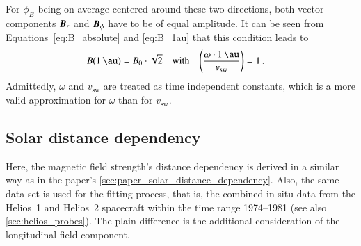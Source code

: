 For $\phi_B$ being on average centered around these two directions, both vector components $\boldsymbol{B}_r$ and $\boldsymbol{B}_\phi$ have to be of equal amplitude. It can be seen from Equations~\ref{eq:B_absolute} and \ref{eq:B_1au} that this condition leads to
\begin{align}
	B(\SI{1}{\au}) &= B_0 \cdot \sqrt{2}	&\text{with}	&	&	\left(\frac{\omega\cdot\SI{1}{\au}}{v_\text{sw}}\right) &= 1\,.
\end{align}
Admittedly, $\omega$ and $v_\text{sw}$ are treated as time independent constants, which is a more valid approximation for $\omega$ than for $v_\text{sw}$.

\subsection{Solar distance dependency}
Here, the magnetic field strength's distance dependency is derived in a similar way as in the paper's \autoref{sec:paper_solar_distance_dependency}. Also, the same data set is used for the fitting process, that is, the combined in-situ data from the Helios~1 and Helios~2 spacecraft within the time range 1974--1981 (see also \autoref{sec:helios_probes}). The plain difference is the additional consideration of the longitudinal field component.

